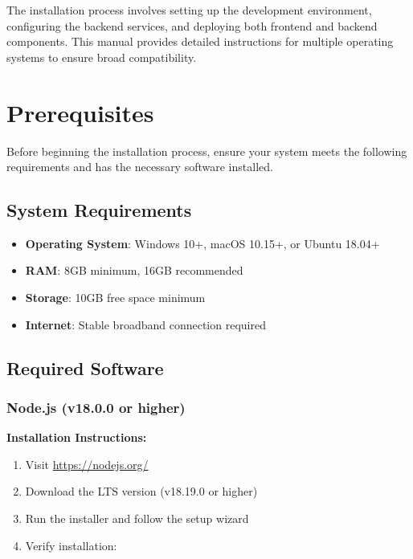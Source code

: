 \documentclass[11pt,a4paper]{article}
\begin{document}
The installation process involves setting up the development environment, configuring the backend services, and deploying both frontend and backend components. This manual provides detailed instructions for multiple operating systems to ensure broad compatibility.

\section{Prerequisites}

Before beginning the installation process, ensure your system meets the following requirements and has the necessary software installed.

\subsection{System Requirements}

\begin{tcolorbox}[colback=lightgray,colframe=black,title=\textbf{Minimum System Requirements}]
\begin{itemize}[leftmargin=*]
    \item \textbf{Operating System}: Windows 10+, macOS 10.15+, or Ubuntu 18.04+
    \item \textbf{RAM}: 8GB minimum, 16GB recommended
    \item \textbf{Storage}: 10GB free space minimum
    \item \textbf{Internet}: Stable broadband connection required
\end{itemize}
\end{tcolorbox}

\subsection{Required Software}

\subsubsection{Node.js (v18.0.0 or higher)}

\textbf{Installation Instructions:}

\begin{enumerate}
    \item Visit \href{https://nodejs.org/}{https://nodejs.org/}
    \item Download the LTS version (v18.19.0 or higher)
    \item Run the installer and follow the setup wizard
    \item Verify installation:
\end{enumerate}
\end{document}
